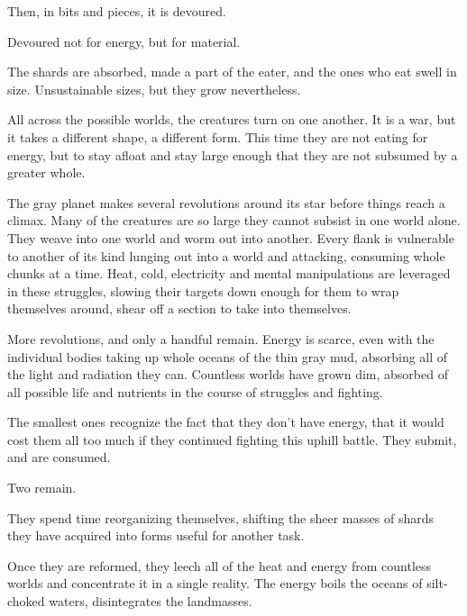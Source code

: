 Then, in bits and pieces, it is devoured.



Devoured not for energy, but for material.



The shards are absorbed, made a part of the eater, and the ones who eat swell in size.  Unsustainable sizes, but they grow nevertheless.



All across the possible worlds, the creatures turn on one another.  It is a war, but it takes a different shape, a different form.  This time they are not eating for energy, but to stay afloat and stay large enough that they are not subsumed by a greater whole.



The gray planet makes several revolutions around its star before things reach a climax.  Many of the creatures are so large they cannot subsist in one world alone.  They weave into one world and worm out into another.  Every flank is vulnerable to another of its kind lunging out into a world and attacking, consuming whole chunks at a time.  Heat, cold, electricity and mental manipulations are leveraged in these struggles, slowing their targets down enough for them to wrap themselves around, shear off a section to take into themselves.



More revolutions, and only a handful remain.  Energy is scarce, even with the individual bodies taking up whole oceans of the thin gray mud, absorbing all of the light and radiation they can.  Countless worlds have grown dim, absorbed of all possible life and nutrients in the course of struggles and fighting.



The smallest ones recognize the fact that they don't have energy, that it would cost them all too much if they continued fighting this uphill battle.  They submit, and are consumed.



Two remain.



They spend time reorganizing themselves, shifting the sheer masses of shards they have acquired into forms useful for another task.



Once they are reformed, they leech all of the heat and energy from countless worlds and concentrate it in a single reality.  The energy boils the oceans of silt-choked waters, disintegrates the landmasses.




